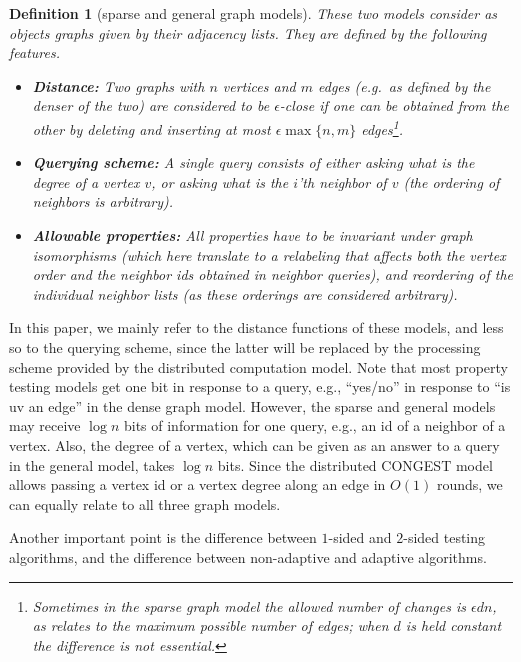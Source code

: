 \documentclass[11pt]{article}
\newtheorem{definition}[theorem]{Definition}
\begin{document}
\begin{definition}[sparse \cite{GoldreichR02} and general \cite{AKKR} graph models]
	These two models consider as objects graphs given by their adjacency lists. They are defined by the following features.
	\begin{itemize}
		\item {\bf Distance:} Two graphs with $n$ vertices and $m$ edges (e.g.\ as defined by the denser of the two) are considered to be {\em $\epsilon$-close} if one can be obtained from the other by deleting and inserting at most $\epsilon\max\{n,m\}$ edges\footnote{Sometimes in the sparse graph model the allowed number of changes is $\epsilon dn$, as relates to the maximum possible number of edges; when $d$ is held constant the difference is not essential.}.
		\item {\bf Querying scheme:} A single query consists of either asking what is the degree of a vertex $v$, or asking what is the $i$'th neighbor of $v$ (the ordering of neighbors is arbitrary).
		\item {\bf Allowable properties:} All properties have to be invariant under graph isomorphisms (which here translate to a relabeling that affects both the vertex order and the neighbor ids obtained in neighbor queries), and reordering of the individual neighbor lists (as these orderings are considered arbitrary).
	\end{itemize}
\end{definition}

In this paper, we mainly refer to the distance functions of these models, and less so to the querying scheme, since the latter will be replaced by the processing scheme provided by the distributed computation model. Note that most property testing models get one bit in response to a query, e.g.,
``yes/no'' in response to ``is uv an edge'' in the dense graph model. However, the sparse and general models may receive $\log{n}$ bits of information for one query, e.g., an id of a neighbor of a vertex. Also, the degree of a vertex, which can be given as an answer to a query in the general model, takes $\log{n}$ bits.
Since the distributed CONGEST model allows passing a vertex id or a vertex degree along an edge in $O(1)$ rounds, we can equally relate to all three graph models.



Another important point is the difference between $1$-sided and $2$-sided testing algorithms, and the difference between non-adaptive and adaptive algorithms.
\end{document}

